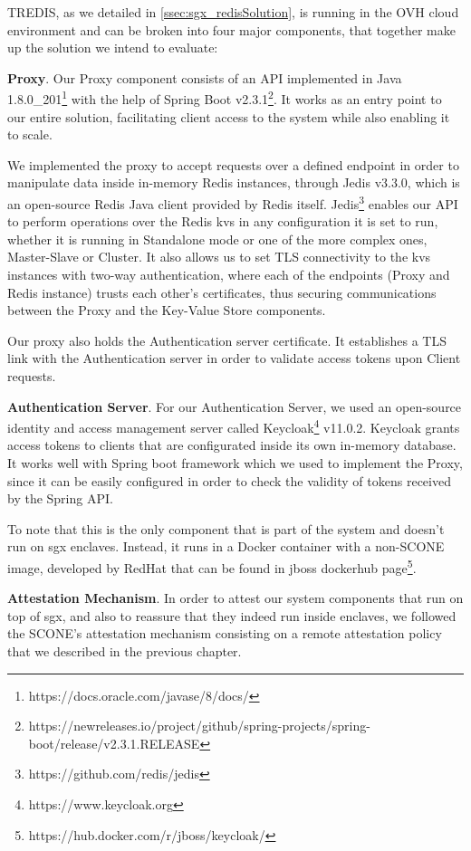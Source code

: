 TREDIS, as we detailed in \ref{ssec:sgx_redisSolution}, is running in the OVH cloud environment and can be broken into four major components, that together make up the solution we intend to evaluate:

\textbf{Proxy}. Our Proxy component consists of an API implemented in Java 1.8.0\_201\footnote{https://docs.oracle.com/javase/8/docs/} with the help of Spring Boot v2.3.1\footnote{https://newreleases.io/project/github/spring-projects/spring-boot/release/v2.3.1.RELEASE}. It works as an entry point to our entire solution, facilitating client access to the system while also enabling it to scale. 

We implemented the proxy to accept requests over a defined endpoint in order to manipulate data inside in-memory Redis instances, through Jedis v3.3.0, which is an open-source Redis Java client provided by Redis itself. Jedis\footnote{https://github.com/redis/jedis} enables our API to perform operations over the Redis \gls{kvs} in any configuration it is set to run, whether it is running in Standalone mode or one of the more complex ones, Master-Slave or Cluster. It also allows us to set TLS connectivity to the \gls{kvs} instances with two-way authentication, where each of the endpoints (Proxy and Redis instance) trusts each other's certificates, thus securing communications between the Proxy and the Key-Value Store components.

Our proxy also holds the Authentication server certificate. It establishes a TLS link with the Authentication server in order to validate access tokens upon Client requests.

\vspace{3mm}
\textbf{Authentication Server}. For our Authentication Server, we used an open-source identity and access management server called Keycloak\footnote{https://www.keycloak.org} v11.0.2. Keycloak grants access tokens to clients that are configurated inside its own in-memory database. It works well with Spring boot framework which we used to implement the Proxy, since it can be easily configured in order to check the validity of tokens received by the Spring API.

To note that this is the only component that is part of the system and doesn't run on \gls{sgx} enclaves. Instead, it runs in a Docker container with a non-SCONE image, developed by RedHat that can be found in jboss dockerhub page\footnote{https://hub.docker.com/r/jboss/keycloak/}.

\vspace{3mm}
\textbf{Attestation Mechanism}. In order to attest our system components that run on top of \gls{sgx}, and also to reassure that they indeed run inside enclaves, we followed the SCONE's attestation mechanism consisting on a remote attestation policy that we described in the previous chapter. 

